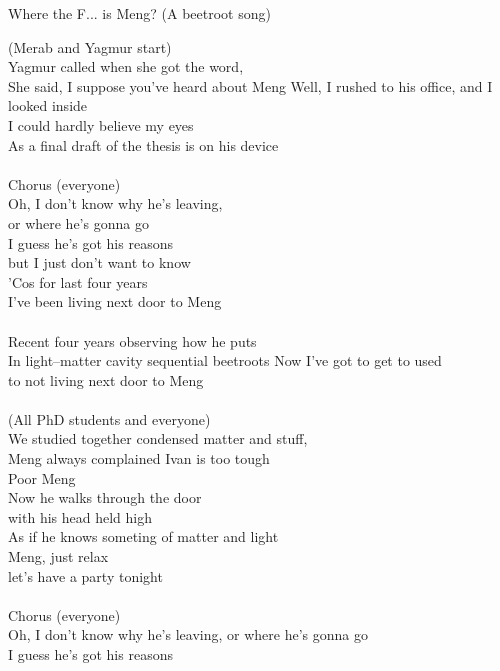 \begin{preface}
    \begin{center}
        Where the F... is Meng? (A beetroot song)
    \end{center}
    (Merab and Yagmur start)\\
    Yagmur called when she got the word,\\
    She said, I suppose you've heard about Meng
    Well, I rushed to his office, and I looked inside\\
    I could hardly believe my eyes\\
    As a final draft of the thesis is on his device\\
    \\
    Chorus (everyone)\\
    Oh, I don't know why he's leaving,\\
    or where he's gonna go\\
    I guess he's got his reasons\\
    but I just don't want to know\\
    'Cos for last four years\\
    I've been living next door to Meng\\
    \\
    Recent four years observing how he puts\\
    In light--matter cavity sequential beetroots Now I've got to get to used\\
    to not living next door to Meng\\
    \\
    (All PhD students and everyone)\\
    We studied together condensed matter and stuff,\\
    Meng always complained Ivan is too tough\\
    Poor Meng\\
    Now he walks through the door\\
    with his head held high\\
    As if he knows someting of matter and light\\
    Meng, just relax\\
    let's have a party tonight\\
    \\
    Chorus (everyone)\\
    Oh, I don't know why he's leaving,
    or where he's gonna go\\
    I guess he's got his reasons\\

\end{preface}
